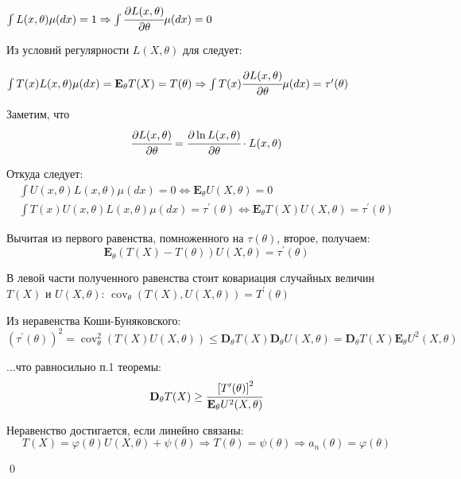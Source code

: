 \documentclass[oneside,final,14pt]{extreport}
\renewenvironment{proof}{{\bfseries Доказательство.}}{\qed}
\theoremstyle{definition}
\begin{document}
\begin{proof}
\( \int L(x, \theta) \mu(d x)=1 \Rightarrow \int \cfrac{\partial L(x, \theta)}{\partial \theta} \mu(d x)=0 \)

Из условий регулярности \( L(X, \theta)\) для следует:

\( \int T(x) L(x, \theta) \mu(d x)=\mathbf{E}_{\theta} T(X)=T(\theta) \Rightarrow \int T(x) \cfrac{\partial L(x, \theta)}{\partial \theta} \mu(d x)=\tau^{\prime}(\theta) \)

Заметим, что
\begin{equation*}
    \cfrac{\partial L(x, \theta)}{\partial \theta}=\cfrac{\partial \ln L(x, \theta)}{\partial \theta} \cdot L(x, \theta)
\end{equation*}

Откуда следует:
\begin{gather*}
    \int U(x, \theta) L(x, \theta) \mu(d x)=0 \Leftrightarrow \mathbf{E}_{\theta} U(X, \theta)=0 \\
\int T(x) U(x, \theta) L(x, \theta) \mu(d x)=\tau^{\prime}(\theta) \Leftrightarrow \mathbf{E}_{\theta} T(X) U(X, \theta)=\tau^{\prime}(\theta)
\end{gather*}

Вычитая из первого равенства, помноженного на \(\tau(\theta)\), второе, получаем:
\begin{equation*}
    \mathbf{E}_{\theta}(T(X)-T(\theta)) U(X, \theta)=\tau^{\prime}(\theta)
\end{equation*}

В левой части полученного равенства стоит ковариация случайных величин \(T(X)\) и \(U(X,\theta)\): \( \operatorname{cov}_{\theta}(T(X), U(X, \theta))=T^{\prime}(\theta) \)

Из неравенства Коши-Буняковского:
\begin{equation*}
    \left(\tau^{\prime}(\theta)\right)^{2}=\operatorname{cov}_{\theta}^{2}(T(X) U(X, \theta)) \leq \mathbf{D}_{\theta} T(X) \mathbf{D}_{\theta} U(X, \theta)=\mathbf{D}_{\theta} T(X) \mathbf{E}_{\theta} U^{2}(X, \theta)
\end{equation*}

...что равносильно п.1 теоремы:
\begin{equation*}
    \mathbf{D}_{\theta} T(X) \geq \cfrac{\left[T^{\prime}(\theta)\right]^{2}}{\mathbf{E}_{\theta} U^{2}(X, \theta)}
\end{equation*}

Неравенство достигается, если линейно связаны:
\begin{equation*}
    T(X)=\varphi(\theta) U(X, \theta)+\psi(\theta) \Rightarrow T(\theta)=\psi(\theta) \Rightarrow a_{n}(\theta)=\varphi(\theta)
\end{equation*}

\end{proof}
\end{document}

